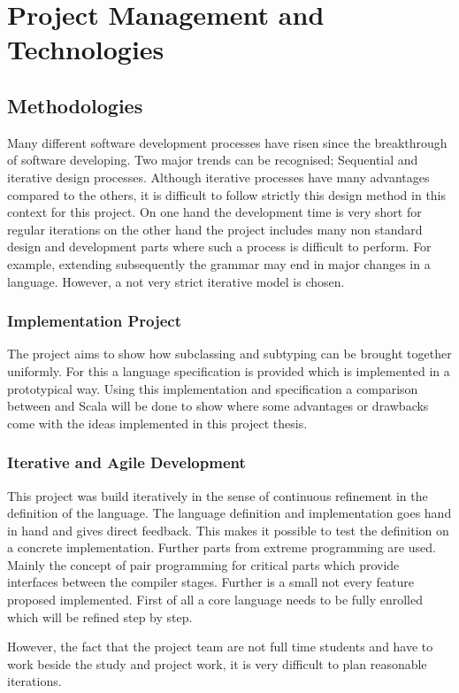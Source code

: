 \chapter{Project Management and Technologies}
\section{Methodologies}
Many different software development processes have risen since the
breakthrough of software developing. Two major trends can be recognised;
Sequential and iterative design processes. Although iterative processes
have many advantages compared to the others, it is difficult to follow
strictly this design method in this context for this project. On one
hand the development time is very short for regular iterations on the
other hand the project includes many non standard design and development
parts where such a process is difficult to perform. For example, extending
subsequently the grammar may end in major changes in a language. However,
a not very strict iterative model is chosen.

\subsection{Implementation Project}
The project aims to show how subclassing and subtyping can be brought
together uniformly. For this a language specification is provided which
is implemented in a prototypical way. Using this implementation and
specification a comparison between \ooplss and Scala will be done to
show where some advantages or drawbacks come with the ideas implemented
in this project thesis.

\subsection{Iterative and Agile Development}
This project was build iteratively in the sense of continuous
refinement in the definition of the language. The language definition and
implementation goes hand in hand and gives direct feedback. This makes it
possible to test the definition on a concrete implementation. Further
parts from extreme programming are used. Mainly the concept of pair
programming for critical parts which provide interfaces between the
compiler stages. Further is a small not every feature proposed implemented.
First of all a core language needs to be fully enrolled which will be refined
step by step.

However, the fact that the project team are not full time students and have
to work beside the study and project work, it is very difficult to plan
reasonable iterations.

